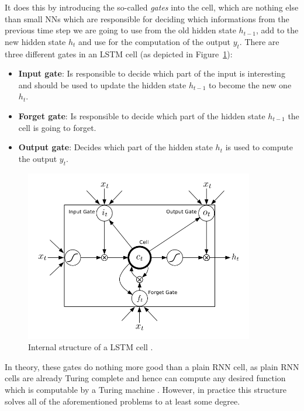 It does this by introducing the so-called \emph{gates} into the cell, which are nothing else than small NNs which are responsible for deciding which informations from the previous time step we are going to use from the old hidden state $h_{t-1}$, add to the new hidden state $h_t$ and use for the computation of the output $y_t$. There are three different gates in an LSTM cell (as depicted in Figure~\ref{fundamentals:lstm:internal_structure}):

\begin{itemize}
	\item \textbf{Input gate}: Is responsible to decide which part of the input is interesting and should be used to update the hidden state $h_{t-1}$ to become the new one $h_t$.
	\item \textbf{Forget gate}: Is responsible to decide which part of the hidden state $h_{t-1}$ the cell is going to forget.
	\item \textbf{Output gate}: Decides which part of the hidden state $h_t$ is used to compute the output $y_t$.
\end{itemize}

\begin{figure}[h]
	\centering
	\includegraphics[width=10cm]{img/lstm_internal}
	\caption{Internal structure of a LSTM cell \cite{Graves:2013}.}
	\label{fundamentals:lstm:internal_structure}
\end{figure}

In theory, these gates do nothing more good than a plain RNN cell, as plain RNN cells are already Turing complete and hence can compute any desired function which is computable by a Turing machine \cite{Siegelmann:1995}. However, in practice this structure solves all of the aforementioned problems to at least some degree.

